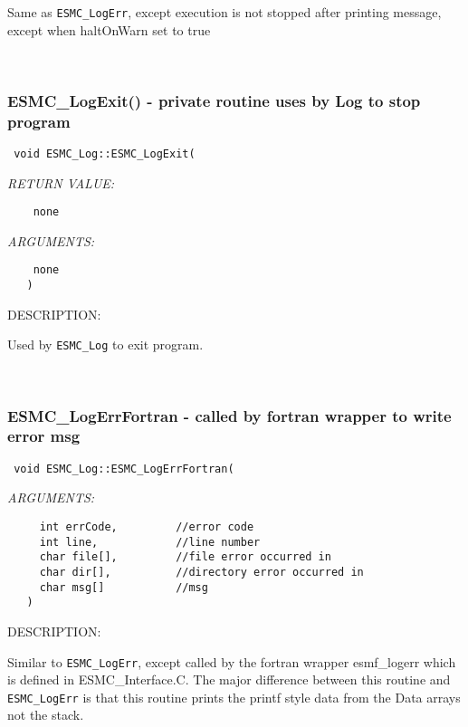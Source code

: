     Same as {\tt ESMC\_LogErr}, except execution is not stopped after
    printing message, except when haltOnWarn set to true
   
 
\mbox{}\hrulefill\ 
 

  \subsubsection [ESMC\_LogExit()] {ESMC\_LogExit() - private routine uses by Log to stop program}


  
\begin{verbatim} void ESMC_Log::ESMC_LogExit(\end{verbatim}{\em RETURN VALUE:}
\begin{verbatim}    none\end{verbatim}{\em ARGUMENTS:}
\begin{verbatim}    none
   )\end{verbatim}
{\sf DESCRIPTION:\\ }


   Used by {\tt ESMC\_Log} to exit program.
   
 
\mbox{}\hrulefill\ 
 

  \subsubsection [ESMC\_LogErrFortran] {ESMC\_LogErrFortran - called by fortran wrapper to write error msg}


  
\begin{verbatim} 
 void ESMC_Log::ESMC_LogErrFortran(
 \end{verbatim}{\em ARGUMENTS:}
\begin{verbatim} 
     int errCode,         //error code
     int line,            //line number
     char file[],         //file error occurred in
     char dir[],          //directory error occurred in
     char msg[]           //msg
   )\end{verbatim}
{\sf DESCRIPTION:\\ }


  Similar to {\tt ESMC\_LogErr}, except called by the fortran wrapper
  esmf\_logerr which is defined in
  ESMC\_Interface.C.  The major difference between this routine
  and {\tt ESMC\_LogErr} is that this
  routine prints the printf style data from the Data arrays not the stack. 
 
